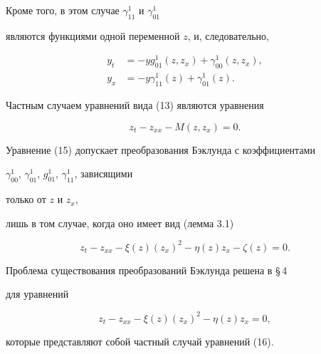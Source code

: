 Кроме того, в этом случае $\gamma_{11}^1$ и $\gamma_{01}^1$ 


являются функциями одной переменной $z$, и, следовательно,


\begin{equation}


\begin{split}


y_t&=- y g_{01}^1 ({z,z_x})+\gamma_{00}^1 ({z,z_x}), \\


y_x&=- y \gamma_{11}^1 (z)+\gamma_{01}^1 (z). 


\end{split} 


\end{equation}





Частным случаем уравнений вида (13) являются уравнения


\begin{equation}


z_t-z_{xx}-M ({z,z_x})=0.


\end{equation}





Уравнение (15) допускает преобразования Бэклунда с коэффициентами


$\gamma_{00}^1$, $\gamma_{01}^1$, $g_{01}^1$, $\gamma_{11}^1$, зависящими 


только от $z$ и $z_x$,


лишь в том случае, когда оно имеет вид (лемма 3.1)


\begin{equation}


z_t-z_{xx}-\xi (z) ({z_x})^2 -


\eta (z) z_x-\zeta (z)=0.


\end{equation}





Проблема существования преобразований Бэклунда решена в \S\,4 


для уравнений 


\begin{equation}


z_t-z_{xx}-\xi (z) ({z_x})^2 -\eta (z) z_x=0,


\end{equation}


которые представляют собой частный случай уравнений (16). 


